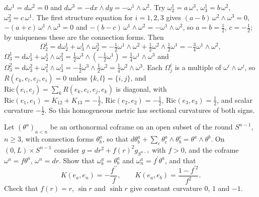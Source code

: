 \begin{solution}
$d\omega^1 = d\omega^2 = 0$ and $d\omega^3 = -dx \wedge dy = -\omega^1 \wedge \omega^2$. Try $\omega^1_2 = a\,\omega^3$, $\omega^1_3 = b\,\omega^2$, $\omega^2_3 = c\,\omega^1$. The first structure equation for
$i = 1, 2, 3$ gives $(a - b)\,\omega^2 \wedge \omega^3 = 0$, $-(a + c)\,\omega^1 \wedge \omega^3 = 0$ and $-(b - c)\,\omega^1 \wedge \omega^2 = -\omega^1 \wedge \omega^2$, so $a = b = \frac12$, $c = -\frac12$; by
uniqueness these are the connection forms. Then
\[
\Omega^1_2 = d\omega^1_2 + \omega^1_3 \wedge \omega^3_2 = -\tfrac12\omega^1 \wedge \omega^2 + \tfrac12\omega^2 \wedge \tfrac12\omega^1 = -\tfrac34\omega^1 \wedge \omega^2,
\]
$\Omega^1_3 = d\omega^1_3 + \omega^1_2 \wedge \omega^2_3 = \tfrac12\omega^3 \wedge (-\tfrac12\omega^1) = \tfrac14\omega^1 \wedge \omega^3$ and
$\Omega^2_3 = d\omega^2_3 + \omega^2_1 \wedge \omega^1_3 = -\tfrac12\omega^3 \wedge \tfrac12\omega^2 = \tfrac14\omega^2 \wedge \omega^3$. Each $\Omega^i_j$ is a multiple of $\omega^i \wedge \omega^j$, so $R(e_k, e_l, e_j, e_i) = 0$
unless $\{k, l\} = \{i, j\}$, and $\mathrm{Ric}(e_i, e_j) = \sum_kR(e_k, e_i, e_j, e_k)$ is diagonal, with $\mathrm{Ric}(e_1, e_1) = K_{12} + K_{13} = -\frac12$, $\mathrm{Ric}(e_2, e_2) = -\frac12$,
$\mathrm{Ric}(e_3, e_3) = \frac12$, and scalar curvature $-\frac12$. So this homogeneous metric has sectional curvatures of both signs.
\end{solution}

\begin{exercise}\label{riemannian-geometry:exercise-warped-products}
Let $(\theta^a)_{a < n}$ be an orthonormal coframe on an open subset of the round $S^{n-1}$, $n \geq 3$, with connection forms $\theta^a_b$, so that $d\theta^a_b + \sum_c\theta^a_c \wedge \theta^c_b = \theta^a \wedge \theta^b$.
On $(0, L) \times S^{n-1}$ consider $g = dr^2 + f(r)^2g_{S^{n-1}}$ with $f > 0$, and the coframe $\omega^a = f\theta^a$, $\omega^n = dr$. Show that $\omega^a_b = \theta^a_b$ and $\omega^a_n = f^{\prime}\theta^a$, and that
\[
K(e_a, e_n) = -\frac{f^{\prime\prime}}{f}, \qquad K(e_a, e_b) = \frac{1 - f^{\prime2}}{f^2} .
\]
Check that $f(r) = r$, $\sin r$ and $\sinh r$ give constant curvature $0$, $1$ and $-1$.
\end{exercise}

